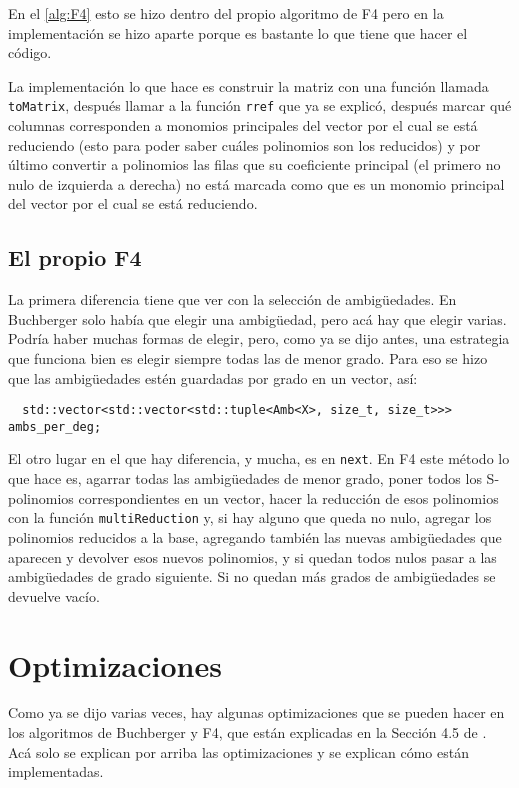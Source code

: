 \documentclass[12pt]{report}
\theoremstyle{customstyle}
\theoremstyle{factstyle}
\begin{document}
En el \cref{alg:F4} esto se hizo dentro del propio algoritmo de F4 pero en la implementación se hizo aparte porque es bastante lo que tiene que hacer el código.

La implementación lo que hace es construir la matriz con una función llamada \texttt{toMatrix}, después llamar a la función \texttt{rref} que ya se explicó, después marcar qué columnas corresponden a monomios principales del vector por el cual se está reduciendo (esto para poder saber cuáles polinomios son los reducidos) y por último convertir a polinomios las filas que su coeficiente principal (el primero no nulo de izquierda a derecha) no está marcada como que es un monomio principal del vector por el cual se está reduciendo.

\subsection{El propio F4}

La primera diferencia tiene que ver con la selección de ambigüedades. En Buchberger solo había que elegir una ambigüedad, pero acá hay que elegir varias. Podría haber muchas formas de elegir, pero, como ya se dijo antes, una estrategia que funciona bien es elegir siempre todas las de menor grado. Para eso se hizo que las ambigüedades estén guardadas por grado en un vector, así:

\begin{verbatim}
  std::vector<std::vector<std::tuple<Amb<X>, size_t, size_t>>> ambs_per_deg;
\end{verbatim}

El otro lugar en el que hay diferencia, y mucha, es en \texttt{next}. En F4 este método lo que hace es, agarrar todas las ambigüedades de menor grado, poner todos los S-polinomios correspondientes en un vector, hacer la reducción de esos polinomios con la función \texttt{multiReduction} y, si hay alguno que queda no nulo, agregar los polinomios reducidos a la base, agregando también las nuevas ambigüedades que aparecen y devolver esos nuevos polinomios, y si quedan todos nulos pasar a las ambigüedades de grado siguiente. Si no quedan más grados de ambigüedades se devuelve vacío.

\section{Optimizaciones}\label{secton:optimizaciones}

Como ya se dijo varias veces, hay algunas optimizaciones que se pueden hacer en los algoritmos de Buchberger y F4, que están explicadas en la Sección 4.5 de \cite{thesis:Hof20}. Acá solo se explican por arriba las optimizaciones y se explican cómo están implementadas.
\end{document}
